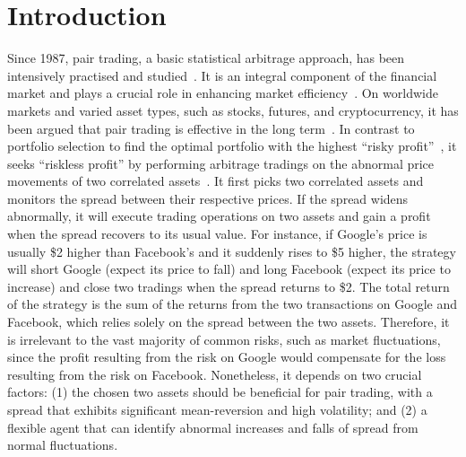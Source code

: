 \documentclass[sigconf]{acmart}
\begin{document}
	




\maketitle

\section{Introduction}
Since 1987, pair trading, a basic statistical arbitrage approach, has been intensively practised and studied~\cite{Lehoczky2018OverviewAH}.
It is an integral component of the financial market and plays a crucial role in enhancing market efficiency~\cite{Shearer2021StabilityEO}.
On worldwide markets and varied asset types, such as stocks, futures, and cryptocurrency, it has been argued that pair trading is effective in the long term~\cite{Krauss2017}.
In contrast to portfolio selection to find the optimal portfolio with the highest ``risky profit''~\cite{Hunanyan2019PortfolioS}, it seeks ``riskless profit'' by performing arbitrage tradings on the abnormal price movements of two correlated assets~\cite{Lehoczky2018OverviewAH}.
It first picks two correlated assets and monitors the spread between their respective prices. If the spread widens abnormally, it will execute trading operations on two assets and gain a profit when the spread recovers to its usual value. For instance, if Google's price is usually \$2 higher than Facebook's and it suddenly rises to \$5 higher, the strategy will short Google (expect its price to fall) and long Facebook (expect its price to increase) and close two tradings when the spread returns to \$2. The total return of the strategy is the sum of the returns from the two transactions on Google and Facebook, which relies solely on the spread between the two assets. Therefore, it is irrelevant to the vast majority of common risks, such as market fluctuations, since the profit resulting from the risk on Google would compensate for the loss resulting from the risk on Facebook. Nonetheless, it depends on two crucial factors: (1) the chosen two assets should be beneficial for pair trading, with a spread that exhibits significant mean-reversion and high volatility; and (2) a flexible agent that can identify abnormal increases and falls of spread from normal fluctuations.
	
\end{document}
